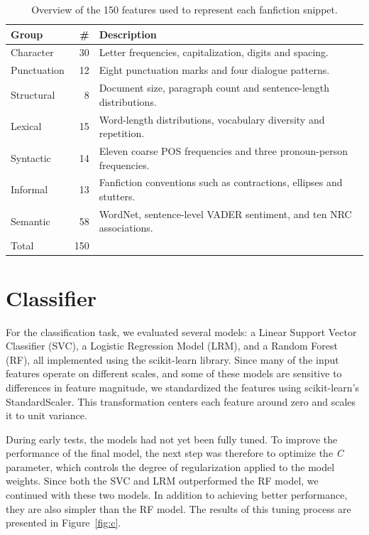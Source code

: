 \documentclass[11pt,twocolumn]{article}
\begin{document}
\begin{table}[ht]
    \centering
    \small
    \caption{Overview of the 150 features used to represent each fanfiction snippet.}
    \label{tab:features}
    \begin{tabularx}{\columnwidth}{@{}lr>{\raggedright\arraybackslash}X@{}}
        \toprule
        Group & \# & Description \\
        \midrule
        Character   & 30 & Letter frequencies, capitalization, digits and spacing. \\
        Punctuation & 12 & Eight punctuation marks and four dialogue patterns. \\
        Structural  &  8 & Document size, paragraph count and sentence-length distributions. \\
        Lexical     & 15 & Word-length distributions, vocabulary diversity and repetition. \\
        Syntactic   & 14 & Eleven coarse POS frequencies and three pronoun-person frequencies. \\
        Informal    & 13 & Fanfiction conventions such as contractions, ellipses and stutters.\\
        Semantic    & 58 & WordNet, sentence-level VADER sentiment, and ten NRC associations. \\
        \midrule
        Total       & 150 & \\
        \bottomrule
    \end{tabularx}
\end{table}


\section{Classifier}
For the classification task, we evaluated several models: a Linear Support Vector Classifier (SVC), a Logistic Regression Model (LRM), and a Random Forest (RF), all implemented using the scikit-learn library. Since many of the input features operate on different scales, and some of these models are sensitive to differences in feature magnitude, we standardized the features using scikit-learn's StandardScaler. This transformation centers each feature around zero and scales it to unit variance.

During early tests, the models had not yet been fully tuned. To improve the performance of the final model, the next step was therefore to optimize the \textit{C} parameter, which controls the degree of regularization applied to the model weights. Since both the SVC and LRM outperformed the RF model, we continued with these two models. In addition to achieving better performance, they are also simpler than the RF model. The results of this tuning process are presented in Figure~\ref{fig:c}.
\end{document}
